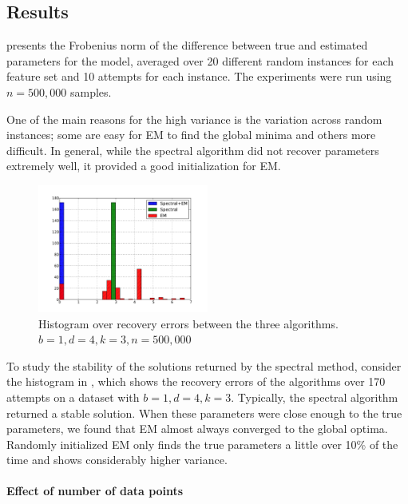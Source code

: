 
\subsection{Results}

 presents the Frobenius norm of the
difference between true and estimated parameters for the model, averaged
over 20 different random instances for each feature set and 10 attempts
for each instance. The experiments were run using $n = 500,000$ samples.

One of the main reasons for the high variance is the variation across
random instances; some are easy for EM to find the global minima and
others more difficult. In general, while the spectral algorithm did not
recover parameters extremely well, it provided a good initialization for
EM.

\begin{figure}[th]
  \centering
  \includegraphics[width=0.50\textwidth]{figures/hist.pdf}
  \caption{Histogram over recovery errors between the three algorithms. $b = 1, d = 4, k = 3, n = 500,000$}
  \label{fig:hist}
\end{figure}

To study the stability of the solutions returned by the spectral method,
consider the histogram in , which shows the recovery
errors of the algorithms over 170 attempts on a dataset with $b = 1, d = 4,
k = 3$. Typically, the spectral algorithm returned a stable solution.
When these parameters were close enough to the true parameters, we found
that EM almost always converged to the global optima. Randomly
initialized EM only finds the true parameters a little over 10\% of the
time and shows considerably higher variance. 

\paragraph{Effect of number of data points}

